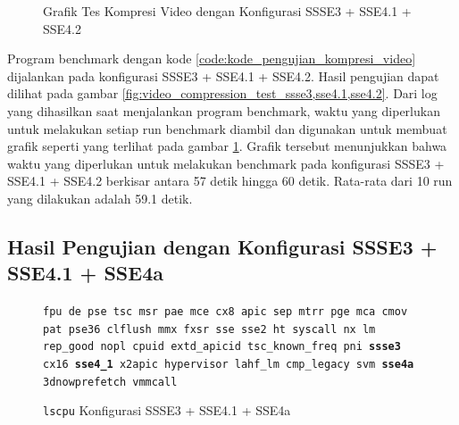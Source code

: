 \begin{figure}
    \centering
    \caption{Grafik Tes Kompresi Video dengan Konfigurasi SSSE3 + SSE4.1 + SSE4.2}
    \label{fig:video_compression_test_ssse3,sse4.1,sse4.2_graph}
\end{figure}

Program benchmark dengan kode \ref{code:kode_pengujian_kompresi_video} dijalankan pada konfigurasi SSSE3 + SSE4.1 + SSE4.2. Hasil pengujian dapat dilihat pada gambar \ref{fig:video_compression_test_ssse3,sse4.1,sse4.2}. Dari log yang dihasilkan saat menjalankan program benchmark, waktu yang diperlukan untuk melakukan setiap run benchmark diambil dan digunakan untuk membuat grafik seperti yang terlihat pada gambar \ref{fig:video_compression_test_ssse3,sse4.1,sse4.2_graph}. Grafik tersebut menunjukkan bahwa waktu yang diperlukan untuk melakukan benchmark pada konfigurasi SSSE3 + SSE4.1 + SSE4.2 berkisar antara 57 detik hingga 60 detik. Rata-rata dari 10 run yang dilakukan adalah 59.1 detik.

\subsection{Hasil Pengujian dengan Konfigurasi SSSE3 + SSE4.1 + SSE4a}
\begin{figure}
    \texttt{fpu de pse tsc msr pae mce cx8 apic sep mtrr pge mca cmov pat pse36 clflush mmx fxsr sse sse2 ht syscall nx lm rep\_good nopl cpuid extd\_apicid tsc\_known\_freq pni \textbf{ssse3} cx16 \textbf{sse4\_1} x2apic hypervisor lahf\_lm cmp\_legacy svm \textbf{sse4a} 3dnowprefetch vmmcall}
    \caption{\texttt{lscpu} Konfigurasi SSSE3 + SSE4.1 + SSE4a}
    \label{fig:lscpu_video_compression_test_ssse3,sse4.1,sse4a}
\end{figure}

